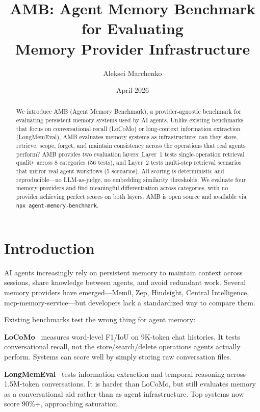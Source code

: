 \documentclass[11pt]{article}
\title{AMB: Agent Memory Benchmark for Evaluating\\Memory Provider Infrastructure}
\author[1]{Aleksei Marchenko}
\affil[1]{Independent Researcher}
\date{April 2026}
\begin{document}
\maketitle

\begin{abstract}
We introduce AMB (Agent Memory Benchmark), a provider-agnostic benchmark for evaluating persistent memory systems used by AI agents. Unlike existing benchmarks that focus on conversational recall (LoCoMo) or long-context information extraction (LongMemEval), AMB evaluates memory systems as infrastructure: can they store, retrieve, scope, forget, and maintain consistency across the operations that real agents perform? AMB provides two evaluation layers: Layer~1 tests single-operation retrieval quality across 8 categories (56 tests), and Layer~2 tests multi-step retrieval scenarios that mirror real agent workflows (5 scenarios). All scoring is deterministic and reproducible---no LLM-as-judge, no embedding similarity thresholds. We evaluate four memory providers and find meaningful differentiation across categories, with no provider achieving perfect scores on both layers. AMB is open source and available via \texttt{npx agent-memory-benchmark}.
\end{abstract}

\section{Introduction}

AI agents increasingly rely on persistent memory to maintain context across sessions, share knowledge between agents, and avoid redundant work. Several memory providers have emerged---Mem0, Zep, Hindsight, Central Intelligence, mcp-memory-service---but developers lack a standardized way to compare them.

Existing benchmarks test the wrong thing for agent memory:

\textbf{LoCoMo}~\citep{maharana2024} measures word-level F1/IoU on 9K-token chat histories. It tests conversational recall, not the store/search/delete operations agents actually perform. Systems can score well by simply storing raw conversation files.

\textbf{LongMemEval}~\citep{wu2025} tests information extraction and temporal reasoning across 1.5M-token conversations. It is harder than LoCoMo, but still evaluates memory as a conversational aid rather than as agent infrastructure. Top systems now score 90\%+, approaching saturation.
\end{document}
